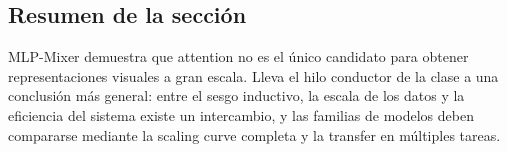 
\subsection{Resumen de la sección}

MLP-Mixer demuestra que attention no es el único candidato para obtener representaciones visuales a gran escala. Lleva el hilo conductor de la clase a una conclusión más general: entre el sesgo inductivo, la escala de los datos y la eficiencia del sistema existe un intercambio, y las familias de modelos deben compararse mediante la scaling curve completa y la transfer en múltiples tareas.
